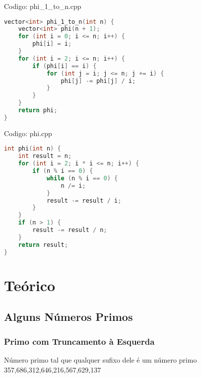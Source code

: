 \documentclass[10pt, a4paper, oneside]{book}
\begin{document}
\hfill

Codigo: phi\_1\_to\_n.cpp

\begin{lstlisting}[language=C++]
vector<int> phi_1_to_n(int n) {
    vector<int> phi(n + 1);
    for (int i = 0; i <= n; i++) {
        phi[i] = i;
    }
    for (int i = 2; i <= n; i++) {
        if (phi[i] == i) {
            for (int j = i; j <= n; j += i) {
                phi[j] -= phi[j] / i;
            }
        }
    }
    return phi;
}
\end{lstlisting}
\hfill

Codigo: phi.cpp

\begin{lstlisting}[language=C++]
int phi(int n) {
    int result = n;
    for (int i = 2; i * i <= n; i++) {
        if (n % i == 0) {
            while (n % i == 0) {
                n /= i;
            }
            result -= result / i;
        }
    }
    if (n > 1) {
        result -= result / n;
    }
    return result;
}
\end{lstlisting}
\hfill

\chapter{Teórico}

\twocolumn

\section{Alguns Números Primos}

\subsection{Primo com Truncamento à Esquerda}
\large{Número primo tal que qualquer sufixo dele é um número primo} \\
\Large{357,686,312,646,216,567,629,137}
\end{document}
